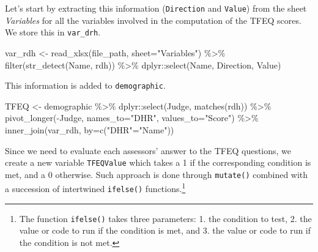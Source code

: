 \documentclass[
]{book}
\newenvironment{Shaded}{\begin{snugshade}}{\end{snugshade}}
\newcommand{\AttributeTok}[1]{\textcolor[rgb]{0.77,0.63,0.00}{#1}}
\newcommand{\FunctionTok}[1]{\textcolor[rgb]{0.00,0.00,0.00}{#1}}
\newcommand{\NormalTok}[1]{#1}
\newcommand{\OtherTok}[1]{\textcolor[rgb]{0.56,0.35,0.01}{#1}}
\newcommand{\SpecialCharTok}[1]{\textcolor[rgb]{0.00,0.00,0.00}{#1}}
\newcommand{\StringTok}[1]{\textcolor[rgb]{0.31,0.60,0.02}{#1}}
\begin{document}
Let's start by extracting this information (\texttt{Direction} and \texttt{Value}) from the sheet \emph{Variables} for all the variables involved in the computation of the TFEQ scores. We store this in \texttt{var\_drh}.

\begin{Shaded}
\begin{Highlighting}[]
\NormalTok{var\_rdh }\OtherTok{\textless{}{-}} \FunctionTok{read\_xlsx}\NormalTok{(file\_path, }\AttributeTok{sheet=}\StringTok{"Variables"}\NormalTok{) }\SpecialCharTok{\%\textgreater{}\%} 
  \FunctionTok{filter}\NormalTok{(}\FunctionTok{str\_detect}\NormalTok{(Name, rdh)) }\SpecialCharTok{\%\textgreater{}\%} 
\NormalTok{  dplyr}\SpecialCharTok{::}\FunctionTok{select}\NormalTok{(Name, Direction, Value)}
\end{Highlighting}
\end{Shaded}

This information is added to \texttt{demographic}.

\begin{Shaded}
\begin{Highlighting}[]
\NormalTok{TFEQ }\OtherTok{\textless{}{-}}\NormalTok{ demographic }\SpecialCharTok{\%\textgreater{}\%} 
\NormalTok{  dplyr}\SpecialCharTok{::}\FunctionTok{select}\NormalTok{(Judge, }\FunctionTok{matches}\NormalTok{(rdh)) }\SpecialCharTok{\%\textgreater{}\%} 
  \FunctionTok{pivot\_longer}\NormalTok{(}\SpecialCharTok{{-}}\NormalTok{Judge, }\AttributeTok{names\_to=}\StringTok{"DHR"}\NormalTok{, }\AttributeTok{values\_to=}\StringTok{"Score"}\NormalTok{) }\SpecialCharTok{\%\textgreater{}\%} 
  \FunctionTok{inner\_join}\NormalTok{(var\_rdh, }\AttributeTok{by=}\FunctionTok{c}\NormalTok{(}\StringTok{"DHR"}\OtherTok{=}\StringTok{"Name"}\NormalTok{))}
\end{Highlighting}
\end{Shaded}

Since we need to evaluate each assessors' answer to the TFEQ questions, we create a new variable \texttt{TFEQValue} which takes a 1 if the corresponding condition is met, and a 0 otherwise. Such approach is done through \texttt{mutate()} combined with a succession of intertwined \texttt{ifelse()} functions.\footnote{The function \texttt{ifelse()} takes three parameters: 1. the condition to test, 2. the value or code to run if the condition is met, and 3. the value or code to run if the condition is not met.}
\end{document}
